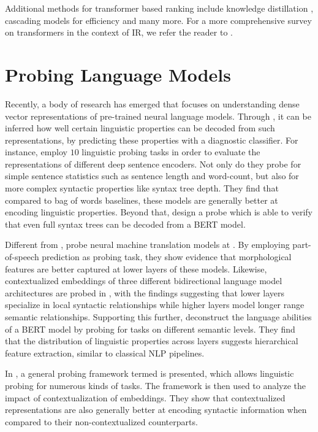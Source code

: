 Additional methods for transformer based ranking include knowledge distillation \citep{DBLP:journals/corr/abs-2009-07531, DBLP:journals/corr/abs-2010-02666}, cascading models for efficiency \citep{Nogueira2019MultiStageDR} and many more. For a more comprehensive survey on transformers in the context of IR, we refer the reader to \citep{10.1145/3437963.3441667}.

\section{Probing Language Models}
Recently, a body of research has emerged that focuses on understanding dense vector representations of pre-trained neural language models. Through , it can be inferred how well certain linguistic properties can be decoded from such representations, by predicting these properties with a diagnostic classifier. For instance, \citet{conneau-etal-2018-cram} employ $10$ linguistic probing tasks in order to evaluate the representations of different deep sentence encoders. Not only do they probe for simple sentence statistics such as sentence length and word-count, but also for more complex syntactic properties like syntax tree depth. They find that compared to bag of words baselines, these models are generally better at encoding linguistic properties. Beyond that, \citet{Hewitt2019ASP} design a probe which is able to verify that even full syntax trees can be decoded from a BERT model.

Different from \citet{conneau-etal-2018-cram}, \citet{Belinkov2017WhatDN} probe neural machine translation models at . By employing part-of-speech prediction as probing task, they show evidence that morphological features are better captured at lower layers of these models. Likewise, contextualized embeddings of three different bidirectional language model architectures are probed in \citep{peters-etal-2018-dissecting}, with the findings suggesting that lower layers specialize in local syntactic relationships while higher layers model longer range semantic relationships. Supporting this further, \citet{tenney-etal-2019-bert} deconstruct the language abilities of a BERT model by probing for tasks on different semantic levels. They find that the distribution of linguistic properties across layers suggests hierarchical feature extraction, similar to classical NLP pipelines.

In \citep{Tenney2019WhatDY}, a general probing framework termed  is presented, which allows linguistic probing for numerous kinds of tasks. The framework is then used to analyze the impact of contextualization of embeddings. They show that contextualized representations are also generally better at encoding syntactic information when compared to their non-contextualized counterparts.

